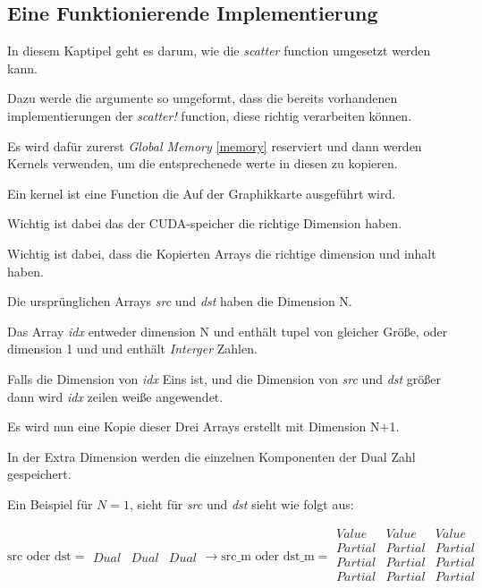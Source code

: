 \subsection{Eine Funktionierende Implementierung}

In diesem Kaptipel geht es darum, wie die \textit{scatter} function umgesetzt werden kann.

Dazu werde die argumente so umgeformt, 
dass die bereits vorhandenen implementierungen der \textit{scatter!} function, 
diese richtig verarbeiten können.

Es wird dafür zurerst \textit{Global Memory} \ref{memory} reserviert und dann werden Kernels verwenden, 
um die entsprechenede werte in diesen zu kopieren.

Ein kernel ist eine Function die Auf der Graphikkarte ausgeführt wird.

Wichtig ist dabei das der CUDA-speicher die richtige Dimension haben. 

Wichtig ist dabei, dass die Kopierten Arrays die richtige dimension und inhalt haben. 

Die ursprünglichen Arrays \textit{src} und \textit{dst} haben die Dimension N.

Das Array \textit{idx} entweder dimension N und enthält tupel von gleicher Größe,
oder dimension 1 und und enthält \textit{Interger} Zahlen.

Falls die Dimension von \textit{idx} Eins ist, und die Dimension von \textit{src}
und \textit{dst} größer dann wird \textit{idx} zeilen weiße angewendet.

Es wird nun eine Kopie dieser Drei Arrays erstellt mit Dimension N+1.

In der Extra Dimension werden die einzelnen Komponenten der Dual Zahl gespeichert.

Ein Beispiel für $N = 1$, sieht für \textit{src} und \textit{dst} sieht wie folgt aus:

$$

\text{src oder dst} = 

\begin{matrix}
Dual & Dual & Dual
\end{matrix}

\rightarrow

\text{src_m oder dst_m} = 

\begin{matrix}
Value   & Value   & Value   \\
Partial & Partial & Partial \\
Partial & Partial & Partial \\
Partial & Partial & Partial \\
\end{matrix}
$$

